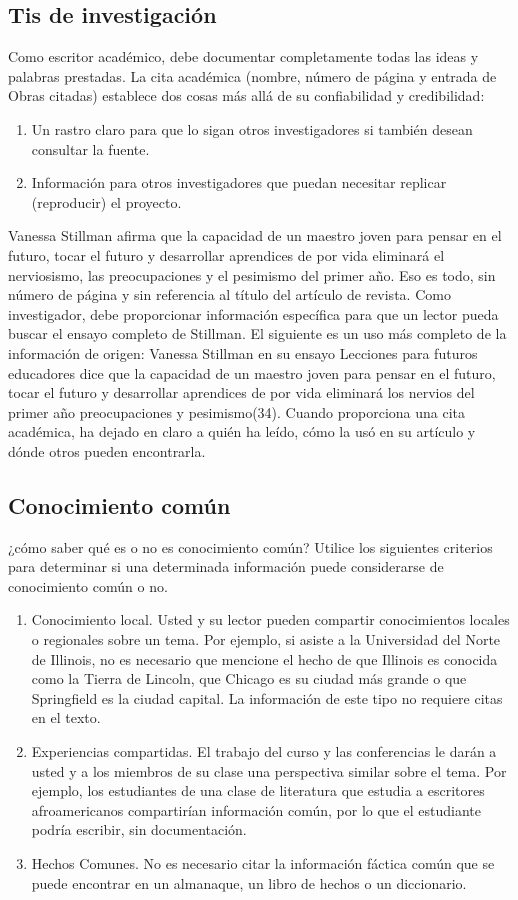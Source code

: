 \subsection{Tis de investigación}
Como escritor académico, debe documentar completamente todas las ideas y palabras prestadas. La cita académica (nombre, número de página y entrada de Obras citadas) establece dos cosas más allá de su confiabilidad y credibilidad:
 \begin{enumerate}[1.]
     \item Un rastro claro para que lo sigan otros investigadores si también desean consultar la fuente. 
     \item Información para otros investigadores que puedan necesitar replicar (reproducir) el proyecto.
 \end{enumerate}
 Vanessa Stillman afirma que la capacidad de un maestro joven para pensar en el futuro, tocar el futuro y desarrollar aprendices de por vida eliminará el nerviosismo, las preocupaciones y el pesimismo del primer año. Eso es todo, sin número de página y sin referencia al título del artículo de revista. Como investigador, debe proporcionar información específica para que un lector pueda buscar el ensayo completo de Stillman. El siguiente es un uso más completo de la información de origen: Vanessa Stillman en su ensayo Lecciones para futuros educadores dice que la capacidad de un maestro joven para pensar en el futuro, tocar el futuro y desarrollar aprendices de por vida eliminará los nervios del primer año preocupaciones y pesimismo(34). Cuando proporciona una cita académica, ha dejado en claro a quién ha leído, cómo la usó en su artículo y dónde otros pueden encontrarla.

 \subsection*{Conocimiento común}
 ¿cómo saber qué es o no es conocimiento común? Utilice los siguientes criterios para determinar si una determinada información puede considerarse de conocimiento común o no.

 \begin{enumerate}[1.]
     \item Conocimiento local. Usted y su lector pueden compartir conocimientos locales o regionales sobre un tema. Por ejemplo, si asiste a la Universidad del Norte de Illinois, no es necesario que mencione el hecho de que Illinois es conocida como la Tierra de Lincoln, que Chicago es su ciudad más grande o que Springfield es la ciudad capital. La información de este tipo no requiere citas en el texto.
     \item Experiencias compartidas. El trabajo del curso y las conferencias le darán a usted y a los miembros de su clase una perspectiva similar sobre el tema. Por ejemplo, los estudiantes de una clase de literatura que estudia a escritores afroamericanos compartirían información común, por lo que el estudiante podría escribir, sin documentación.
     \item Hechos Comunes. No es necesario citar la información fáctica común que se puede encontrar en un almanaque, un libro de hechos o un diccionario. 
 \end{enumerate}


